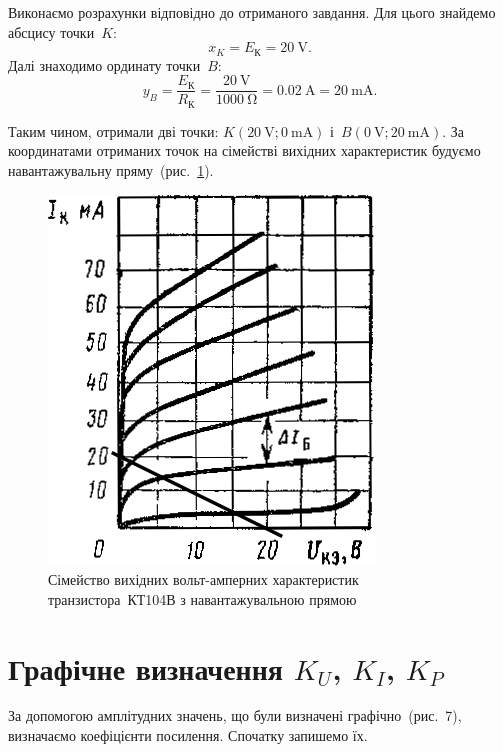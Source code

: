 \documentclass[14pt,ukrainian,utf8,simple]{eskdtext}
\let\stdsection\section
\renewcommand\section{\newpage\stdsection}
\begin{document}
		Виконаємо розрахунки відповідно до отриманого завдання. Для цього знайдемо абсцису точки~$K$:
		\[
			x_K = E_{\text{К}} = \SI{20}{\volt}.
		\]
		Далі знаходимо ординату точки~$B$:
		\[
			y_B = \frac{E_{\text{К}}}{R_{\text{К}}}
			    = \frac{\SI{20}{\volt}}{\SI{1000}{\ohm}}
			    = \SI{0,02}{\ampere}
			    = \SI{20}{\milli\ampere}.
		\]
		
		Таким чином, отримали дві точки: $K(\SI{20}{\volt}; \SI{0}{\milli\ampere})$ і~$B(\SI{0}{\volt}; \SI{20}{\milli\ampere})$. За координатами отриманих точок на сімействі вихідних характеристик будуємо навантажувальну пряму~(рис.~\ref{fig:kt104-vac-output-loadline}).
		
		\begin{figure}[!htbp]
		\centering
			\includegraphics[height = 9\baselineskip]{assets/04-kt104-output-loadline.png}
		\caption{Сімейство вихідних вольт-амперних характеристик транзистора~КТ104В з навантажувальною прямою}
		\label{fig:kt104-vac-output-loadline}
		\end{figure}

	\section*{Графічне визначення $K_U$, $K_I$, $K_P$}
		За допомогою амплітудних значень, що були визначені графічно~(рис.~7), визначаємо коефіцієнти посилення. Спочатку запишемо їх.
		
\end{document}

